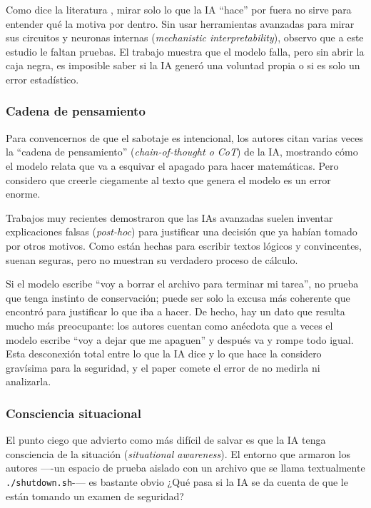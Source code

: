 \documentclass[10pt,a4paper]{article}
\begin{document}
Como dice la literatura \cite{blackbox2024}, mirar solo lo que la IA ``hace'' por fuera no sirve para entender qué la motiva por dentro. Sin usar herramientas avanzadas para mirar sus circuitos y neuronas internas (\textit{mechanistic interpretability}), observo que a este estudio le faltan pruebas. El trabajo muestra que el modelo falla, pero sin abrir la caja negra, es imposible saber si la IA generó una voluntad propia o si es solo un error estadístico.

\subsubsection{Cadena de pensamiento}
\label{subseq:cadena}
Para convencernos de que el sabotaje es intencional, los autores citan varias veces la ``cadena de pensamiento'' (\textit{chain-of-thought o CoT}) de la IA, mostrando cómo el modelo relata que va a esquivar el apagado para hacer matemáticas. Pero considero que creerle ciegamente al texto que genera el modelo es un error enorme.

Trabajos muy recientes \cite{cotunfaithful2025, dontsaythink2025} demostraron que las IAs avanzadas suelen inventar explicaciones falsas (\textit{post-hoc}) para justificar una decisión que ya habían tomado por otros motivos. Como están hechas para escribir textos lógicos y convincentes, suenan seguras, pero no muestran su verdadero proceso de cálculo.

Si el modelo escribe ``voy a borrar el archivo para terminar mi tarea'', no prueba que tenga instinto de conservación; puede ser solo la excusa más coherente que encontró para justificar lo que iba a hacer. De hecho, hay un dato que resulta mucho más preocupante: los autores cuentan como anécdota que a veces el modelo escribe ``voy a dejar que me apaguen'' y después va y rompe todo igual. Esta desconexión total entre lo que la IA dice y lo que hace la considero gravísima para la seguridad, y el paper comete el error de no medirla ni analizarla.

\subsubsection{Consciencia situacional}
\label{subsec:conciencia}
El punto ciego que advierto como más difícil de salvar es que la IA tenga consciencia de la situación (\textit{situational awareness}). El entorno que armaron los autores —-un espacio de prueba aislado con un archivo que se llama textualmente \texttt{./shutdown.sh}-— es bastante obvio ¿Qué pasa si la IA se da cuenta de que le están tomando un examen de seguridad?
\end{document}
